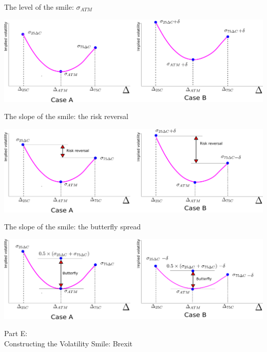 \begin{frame}{The level of the smile: \(\sigma_{ATM}\)}

\includegraphics[width=1\linewidth]{images/figRRLevel}

\end{frame}

\begin{frame}{The slope of the smile: the risk reversal}

\includegraphics[width=1\linewidth]{images/figRRSlope}

\end{frame}

\begin{frame}{The slope of the smile: the butterfly spread}

\includegraphics[width=1\linewidth]{images/figRRCurvature}

\end{frame}

\begin{frame}{}

\color{blue} \LARGE{Part E:}\\
\LARGE{Constructing the Volatility Smile: Brexit}

\end{frame}

